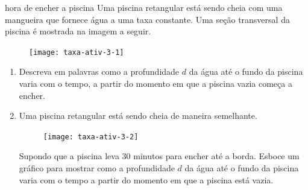 \begin{task}{hora de encher a piscina}
Uma piscina retangular está sendo cheia com uma mangueira que fornece água a uma taxa constante. Uma seção transversal da piscina é mostrada na imagem a seguir.

\begin{figure}[H]
\centering
\texttt{[image: taxa-ativ-3-1]}
\end{figure}

\begin{enumerate}
\item Descreva em palavras como a profundidade $d$ da água até o fundo da piscina varia com o tempo, a partir do momento em que a piscina vazia começa a encher.
\item Uma piscina retangular está sendo cheia de maneira semelhante.

\begin{figure}[H]
\centering
\texttt{[image: taxa-ativ-3-2]}

\end{figure}

Supondo que a piscina leva 30 minutos para encher até a borda. Esboce um gráfico para mostrar como a profundidade $d$ da água até o fundo da piscina varia com o tempo a partir do momento em que a piscina está vazia.

\begin{figure}[H]
\centering

\end{figure}
\end{enumerate}
\end{task}

